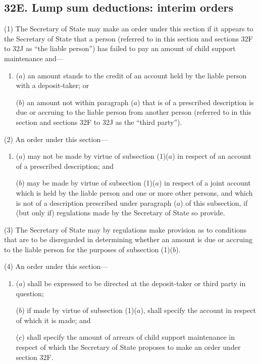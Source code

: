 \documentclass[12pt,a4paper]{article}
\begin{document}
\subsection{32E. Lump sum deductions: interim orders}

(1) The Secretary of State may make an order under this section if it appears to the Secretary of State that a person (referred to in this section and sections 32F to 32J as “the liable person”) has failed to pay an amount of child support maintenance and---
\begin{enumerate}\item[]
($a$) an amount stands to the credit of an account held by the liable person with a deposit-taker; or

($b$) an amount not within paragraph ($a$) that is of a prescribed description is due or accruing to the liable person from another person (referred to in this section and sections 32F to 32J as the “third party”).
\end{enumerate}

(2) An order under this section---
\begin{enumerate}\item[]
($a$) may not be made by virtue of subsection (1)($a$) in respect of an account of a prescribed description; and

($b$) may be made by virtue of subsection (1)($a$) in respect of a joint account which is held by the liable person and one or more other persons, and which is not of a description prescribed under paragraph ($a$) of this subsection, if (but only if) regulations made by the Secretary of State so provide.
\end{enumerate}

(3)
The Secretary of State may by regulations make provision as to conditions that are to be disregarded in determining whether an amount is due or accruing to the liable person for the purposes of subsection (1)($b$).

(4)
An order under this section---
\begin{enumerate}\item[]
($a$) shall be expressed to be directed at the deposit-taker or third party in question;

($b$) if made by virtue of subsection (1)($a$), shall specify the account in respect of which it is made; and

($c$) shall specify the amount of arrears of child support maintenance in respect of which the Secretary of State proposes to make an order under section 32F.
\end{enumerate}
\end{document}
